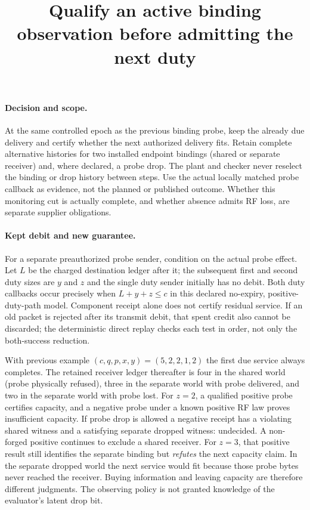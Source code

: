 \documentclass{article}
\title{Qualify an active binding observation before admitting the next duty}
\author{}\date{}
\begin{document}
\maketitle
\paragraph{Decision and scope.}
At the same controlled epoch as the previous binding probe, keep the
already due delivery and certify whether the next authorized delivery
fits. Retain complete alternative histories for two installed endpoint
bindings (shared or separate receiver) and, where declared, a probe
drop. The plant and checker never reselect the binding or drop history
between steps. Use the actual locally matched probe callback as evidence,
not the planned or published outcome. Whether this monitoring cut is
actually complete, and whether absence admits RF loss, are separate
supplier obligations.

\paragraph{Kept debit and new guarantee.}
For a separate preauthorized probe sender, condition on the actual probe
effect. Let $L$ be the charged destination ledger after it; the subsequent
first and second duty sizes are $y$ and $z$ and the single duty sender
initially has no debit. Both duty callbacks occur precisely when
$L+y+z\le c$ in this declared no-expiry, positive-duty-path model.
Component receipt alone does not certify residual service. If an old
packet is rejected after its transmit debit, that spent credit also
cannot be discarded; the deterministic direct replay checks each test
in order, not only the both-success reduction.

With previous example $(c,q,p,x,y)=(5,2,2,1,2)$ the first due service
always completes. The retained receiver ledger thereafter is four
in the shared world (probe physically refused), three in the separate
world with probe delivered, and two in the separate world with probe
lost. For $z=2$, a qualified positive probe certifies capacity, and a
negative probe under a known positive RF law proves insufficient
capacity. If probe drop is allowed a negative receipt has a violating
shared witness and a satisfying separate dropped witness: undecided.
A non-forged positive continues to exclude a shared receiver.
For $z=3$, that positive result still identifies the separate binding
but \emph{refutes} the next capacity claim. In the separate dropped
world the next service would fit because those probe bytes never
reached the receiver. Buying information and leaving capacity are
therefore different judgments. The observing policy is not granted
knowledge of the evaluator's latent drop bit.
\end{document}
